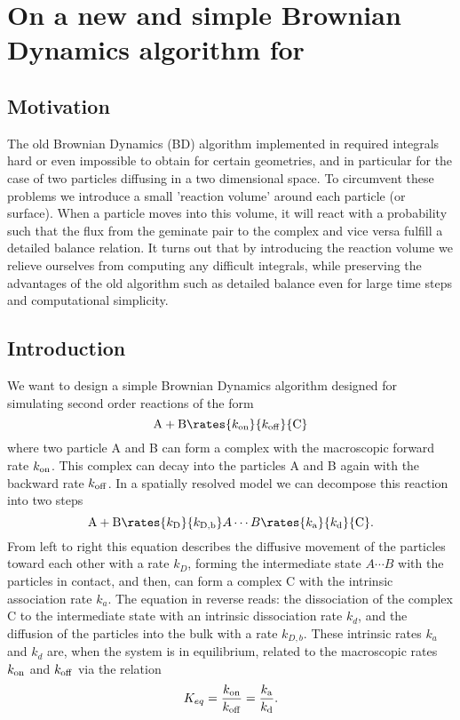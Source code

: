 \section{On a new and simple Brownian Dynamics algorithm for \GFRD}

\subsection{Motivation}

The old Brownian Dynamics (BD) algorithm implemented in \GFRD \cite{Morelli2008a} required integrals hard or even impossible to obtain for certain geometries, and in particular for the case of two particles diffusing in a two dimensional space. To circumvent these problems we introduce a small 'reaction volume' around each particle (or surface). When a particle moves into this volume, it will react with a probability such that the flux from the geminate pair to the complex and vice versa fulfill a detailed balance relation. It turns out that by introducing the reaction volume we relieve ourselves from computing any difficult integrals, while preserving the advantages of the old algorithm such as detailed balance even for large time steps and computational simplicity.

\subsection{Introduction}

We want to design a simple Brownian Dynamics algorithm designed for simulating second order reactions of the form
\begin{equation}
{\rm A} + {\rm B} \rates{k_{\rm on}}{k_{\rm off}} {\rm C}
\end{equation}
where two particle A and B can form a complex with the macroscopic forward rate $k_{\rm on}$. This complex can decay into the particles A and B again with the backward rate $k_{\rm off}$. In a spatially resolved model we can decompose this reaction into two steps \cite{Agmon1990}
\begin{equation}
{\rm A} + {\rm B} \rates{k_{\rm D}}{k_{\rm D,b}} A \cdots B \rates{k_{\rm a}}{k_{\rm d}} {\rm C}.
\end{equation}
From left to right this equation describes the diffusive movement of the particles toward each other with a rate $k_D$, forming the intermediate state $A \cdots B$ with the particles in contact, and then, can form a complex C with the intrinsic association rate $k_a$. The equation in reverse reads: the dissociation of the complex C to the intermediate state with an intrinsic dissociation rate $k_d$, and the diffusion of the particles into the bulk with a rate $k_{D,b}$. These intrinsic rates $k_a$ and $k_d$ are, when the system is in equilibrium, related to the macroscopic rates $k_{\rm on}$ and $k_{\rm off}$ via the relation \cite{Agmon1990}
\begin{equation}
K_{eq} = \frac{k_{\rm on}}{k_{\rm off}} = \frac{k_{\rm a}}{k_{\rm d}}.
\end{equation}

